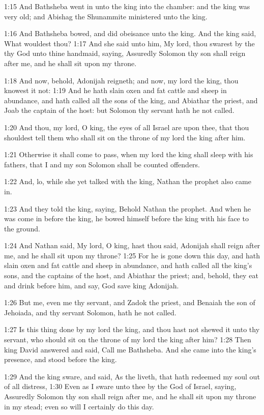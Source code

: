 1:15 And Bathsheba went in unto the king into the chamber: and the
king was very old; and Abishag the Shunammite ministered unto the
king.

1:16 And Bathsheba bowed, and did obeisance unto the king. And the
king said, What wouldest thou?  1:17 And she said unto him, My lord,
thou swarest by the \LORD thy God unto thine handmaid, saying,
Assuredly Solomon thy son shall reign after me, and he shall sit upon
my throne.

1:18 And now, behold, Adonijah reigneth; and now, my lord the king,
thou knowest it not: 1:19 And he hath slain oxen and fat cattle and
sheep in abundance, and hath called all the sons of the king, and
Abiathar the priest, and Joab the captain of the host: but Solomon thy
servant hath he not called.

1:20 And thou, my lord, O king, the eyes of all Israel are upon thee,
that thou shouldest tell them who shall sit on the throne of my lord
the king after him.

1:21 Otherwise it shall come to pass, when my lord the king shall
sleep with his fathers, that I and my son Solomon shall be counted
offenders.

1:22 And, lo, while she yet talked with the king, Nathan the prophet
also came in.

1:23 And they told the king, saying, Behold Nathan the prophet. And
when he was come in before the king, he bowed himself before the king
with his face to the ground.

1:24 And Nathan said, My lord, O king, hast thou said, Adonijah shall
reign after me, and he shall sit upon my throne?  1:25 For he is gone
down this day, and hath slain oxen and fat cattle and sheep in
abundance, and hath called all the king's sons, and the captains of
the host, and Abiathar the priest; and, behold, they eat and drink
before him, and say, God save king Adonijah.

1:26 But me, even me thy servant, and Zadok the priest, and Benaiah
the son of Jehoiada, and thy servant Solomon, hath he not called.

1:27 Is this thing done by my lord the king, and thou hast not shewed
it unto thy servant, who should sit on the throne of my lord the king
after him?  1:28 Then king David answered and said, Call me Bathsheba.
And she came into the king's presence, and stood before the king.

1:29 And the king sware, and said, As the \LORD liveth, that hath
redeemed my soul out of all distress, 1:30 Even as I sware unto thee
by the \LORD God of Israel, saying, Assuredly Solomon thy son shall
reign after me, and he shall sit upon my throne in my stead; even so
will I certainly do this day.


